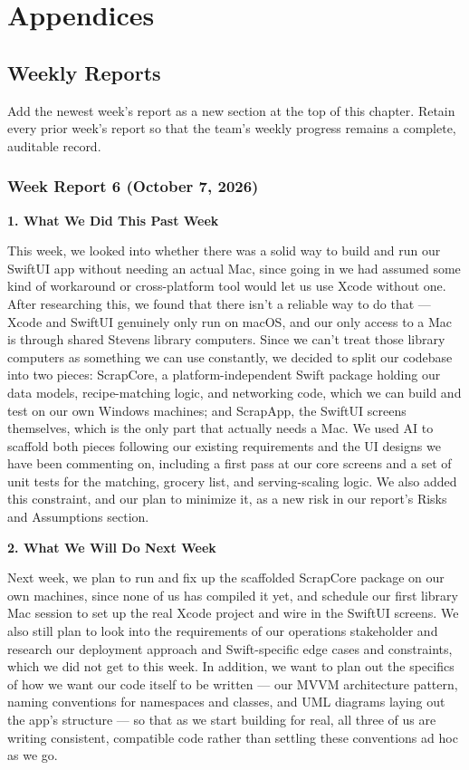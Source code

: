 \part{Appendices}

\chapter{Weekly Reports}
Add the newest week's report as a new section at the top of this chapter. Retain every prior week's report so that the team's weekly progress remains a complete, auditable record.

\section{Week Report 6 (October 7, 2026)}

\noindent\textbf{1. What We Did This Past Week}

This week, we looked into whether there was a solid way to build and run our SwiftUI app without needing an actual Mac, since going in we had assumed some kind of workaround or cross-platform tool would let us use Xcode without one. After researching this, we found that there isn't a reliable way to do that --- Xcode and SwiftUI genuinely only run on macOS, and our only access to a Mac is through shared Stevens library computers. Since we can't treat those library computers as something we can use constantly, we decided to split our codebase into two pieces: ScrapCore, a platform-independent Swift package holding our data models, recipe-matching logic, and networking code, which we can build and test on our own Windows machines; and ScrapApp, the SwiftUI screens themselves, which is the only part that actually needs a Mac. We used AI to scaffold both pieces following our existing requirements and the UI designs we have been commenting on, including a first pass at our core screens and a set of unit tests for the matching, grocery list, and serving-scaling logic. We also added this constraint, and our plan to minimize it, as a new risk in our report's Risks and Assumptions section.

\noindent\textbf{2. What We Will Do Next Week}

Next week, we plan to run and fix up the scaffolded ScrapCore package on our own machines, since none of us has compiled it yet, and schedule our first library Mac session to set up the real Xcode project and wire in the SwiftUI screens. We also still plan to look into the requirements of our operations stakeholder and research our deployment approach and Swift-specific edge cases and constraints, which we did not get to this week. In addition, we want to plan out the specifics of how we want our code itself to be written --- our MVVM architecture pattern, naming conventions for namespaces and classes, and UML diagrams laying out the app's structure --- so that as we start building for real, all three of us are writing consistent, compatible code rather than settling these conventions ad hoc as we go.

